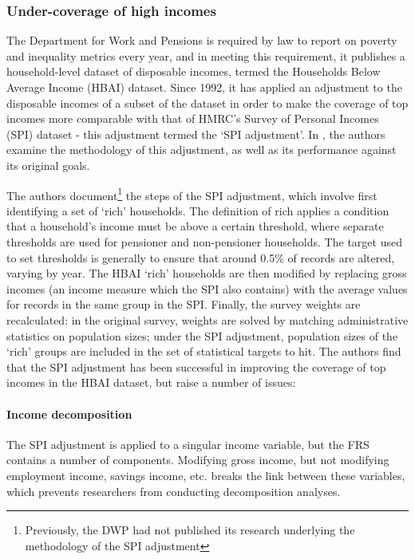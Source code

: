 \documentclass[10pt,journal,compsoc]{IEEEtran}
\begin{document}
\subsubsection{Under-coverage of high incomes}

The Department for Work and Pensions is required by law to report on poverty and inequality metrics every year, and in meeting this requirement, it publishes a household-level dataset of disposable incomes, termed the Households Below Average Income (HBAI) dataset\cite{hbai}. Since 1992, it has applied an adjustment to the disposable incomes of a subset of the dataset in order to make the coverage of top incomes more comparable with that of HMRC's Survey of Personal Incomes (SPI) dataset - this adjustment termed the `SPI adjustment'. In \cite{ifs_survey_under_coverage}, the authors examine the methodology of this adjustment, as well as its performance against its original goals.

The authors document\footnote{Previously, the DWP had not published its research underlying the methodology of the SPI adjustment} the steps of the SPI adjustment, which involve first identifying a set of `rich' households. The definition of rich applies a condition that a household's income must be above a certain threshold, where separate thresholds are used for pensioner and non-pensioner households. The target used to set thresholds is generally to ensure that around 0.5\% of records are altered, varying by year. The HBAI `rich' households are then modified by replacing gross incomes (an income measure which the SPI also contains) with the average values for records in the same group in the SPI. Finally, the survey weights are recalculated: in the original survey, weights are solved by matching administrative statistics on population sizes; under the SPI adjustment, population sizes of the `rich' groups are included in the set of statistical targets to hit. The authors find that the SPI adjustment has been successful in improving the coverage of top incomes in the HBAI dataset, but raise a number of issues:

\paragraph{Income decomposition} The SPI adjustment is applied to a singular income variable, but the FRS contains a number of components. Modifying gross income, but not modifying employment income, savings income, etc. breaks the link between these variables, which prevents researchers from conducting decomposition analyses.
\end{document}

